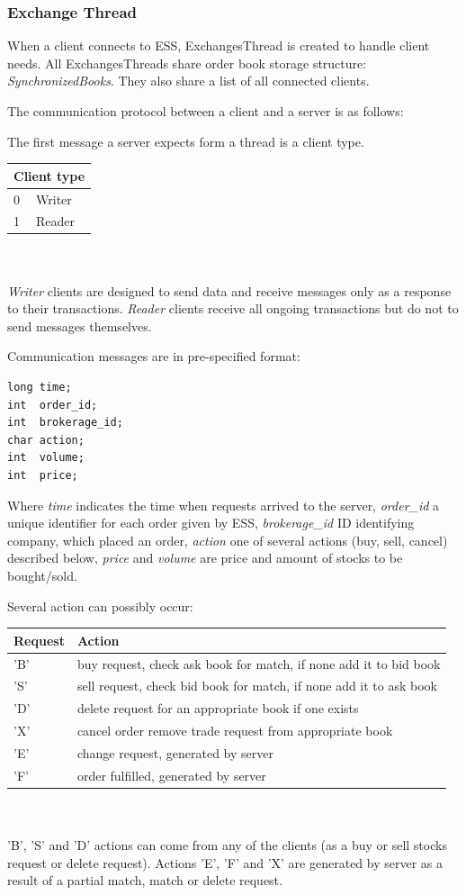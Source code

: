 \documentclass[14pt]{article}
\begin{document}
\subsubsection{Exchange Thread}
When a client connects to ESS, ExchangesThread is created to handle client needs. All ExchangesThreads share order book storage structure: \emph{SynchronizedBooks}. They also share a list of all connected clients.

\noindent The communication protocol between a client and a server is as follows: 

\noindent The first message a server expects form a thread is a client type.

\begin{tabular}{|l|l|}
  \hline
  \multicolumn{2}{|c|}{Client type} \\
  \hline
  0 & Writer\\ \hline
  1 & Reader \\
  \hline
\end{tabular}
\\
\\
\emph{Writer} clients are designed to send data and receive messages only as a response to their transactions. \emph{Reader} clients receive all ongoing transactions but do not to send messages themselves.

Communication messages  are in pre-specified format:

\begin{verbatim}
long time;
int  order_id;
int  brokerage_id;
char action;
int  volume;
int  price;
\end{verbatim}

Where \emph{time} indicates the time when requests arrived to the server, \emph{order\_id} a unique identifier for each order given by ESS, \emph{brokerage\_id} ID identifying company, which placed an order, \emph{action} one of several actions (buy, sell, cancel) described below, \emph{price} and \emph{volume} are price and amount of stocks to be bought/sold. 

\noindent Several action can possibly occur:

\begin{tabular}{|l|l|}
  \hline
  Request & Action \\ \hline
  'B' & buy request, check ask book for match, if none add it to bid book \\ \hline
  'S' & sell request, check bid book for match, if none add it to ask book \\ \hline
  'D' & delete request for an appropriate book if one exists \\ \hline
  'X' & cancel order remove trade request from appropriate book\\ \hline
  'E' & change request, generated by server \\ \hline
  'F' & order fulfilled, generated by server \\
  \hline
\end{tabular}
\\
\\
\noindent 'B', 'S' and 'D' actions can come from any of the clients (as a buy or sell stocks request or delete request). Actions 'E', 'F' and 'X' are generated by server as a result of a partial match, match or delete request. 
\end{document}
